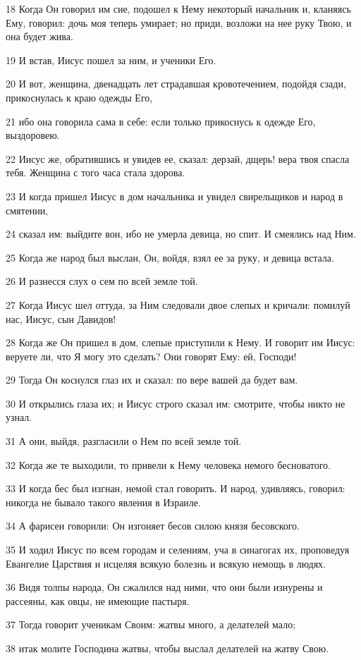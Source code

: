 \par 18 Когда Он говорил им сие, подошел к Нему некоторый начальник и, кланяясь Ему, говорил: дочь моя теперь умирает; но приди, возложи на нее руку Твою, и она будет жива.
\par 19 И встав, Иисус пошел за ним, и ученики Его.
\par 20 И вот, женщина, двенадцать лет страдавшая кровотечением, подойдя сзади, прикоснулась к краю одежды Его,
\par 21 ибо она говорила сама в себе: если только прикоснусь к одежде Его, выздоровею.
\par 22 Иисус же, обратившись и увидев ее, сказал: дерзай, дщерь! вера твоя спасла тебя. Женщина с того часа стала здорова.
\par 23 И когда пришел Иисус в дом начальника и увидел свирельщиков и народ в смятении,
\par 24 сказал им: выйдите вон, ибо не умерла девица, но спит. И смеялись над Ним.
\par 25 Когда же народ был выслан, Он, войдя, взял ее за руку, и девица встала.
\par 26 И разнесся слух о сем по всей земле той.
\par 27 Когда Иисус шел оттуда, за Ним следовали двое слепых и кричали: помилуй нас, Иисус, сын Давидов!
\par 28 Когда же Он пришел в дом, слепые приступили к Нему. И говорит им Иисус: веруете ли, что Я могу это сделать? Они говорят Ему: ей, Господи!
\par 29 Тогда Он коснулся глаз их и сказал: по вере вашей да будет вам.
\par 30 И открылись глаза их; и Иисус строго сказал им: смотрите, чтобы никто не узнал.
\par 31 А они, выйдя, разгласили о Нем по всей земле той.
\par 32 Когда же те выходили, то привели к Нему человека немого бесноватого.
\par 33 И когда бес был изгнан, немой стал говорить. И народ, удивляясь, говорил: никогда не бывало такого явления в Израиле.
\par 34 А фарисеи говорили: Он изгоняет бесов силою князя бесовского.
\par 35 И ходил Иисус по всем городам и селениям, уча в синагогах их, проповедуя Евангелие Царствия и исцеляя всякую болезнь и всякую немощь в людях.
\par 36 Видя толпы народа, Он сжалился над ними, что они были изнурены и рассеяны, как овцы, не имеющие пастыря.
\par 37 Тогда говорит ученикам Своим: жатвы много, а делателей мало;
\par 38 итак молите Господина жатвы, чтобы выслал делателей на жатву Свою.

